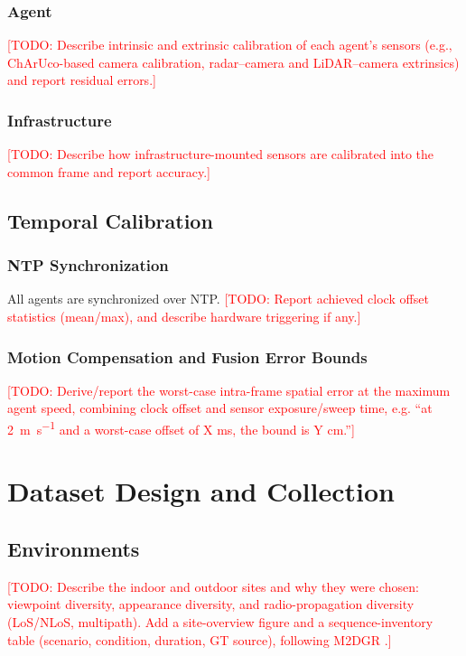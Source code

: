 \documentclass[conference]{IEEEtran}
\newcommand{\todo}[1]{\textcolor{red}{[TODO: #1]}}
\begin{document}
\subsubsection{Agent}
\todo{Describe intrinsic and extrinsic calibration of each agent's sensors
(e.g., ChArUco-based camera calibration, radar--camera and LiDAR--camera
extrinsics) and report residual errors.}

\subsubsection{Infrastructure}
\todo{Describe how infrastructure-mounted sensors are calibrated into the
common frame and report accuracy.}

\subsection{Temporal Calibration}
\subsubsection{NTP Synchronization}
All agents are synchronized over NTP. \todo{Report achieved clock offset
statistics (mean/max), and describe hardware triggering if any.}

\subsubsection{Motion Compensation and Fusion Error Bounds}
\todo{Derive/report the worst-case intra-frame spatial error at the maximum
agent speed, combining clock offset and sensor exposure/sweep time, e.g.
``at \SI{2}{\meter\per\second} and a worst-case offset of X ms, the bound
is Y cm.''}

\section{Dataset Design and Collection}
\label{sec:collection}

\subsection{Environments}
\todo{Describe the indoor and outdoor sites and why they were chosen:
viewpoint diversity, appearance diversity, and radio-propagation diversity
(LoS/NLoS, multipath). Add a site-overview figure and a sequence-inventory
table (scenario, condition, duration, GT source), following M2DGR
\cite{m2dgr}.}
\end{document}
